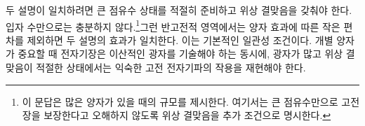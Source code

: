 두 설명이 일치하려면 큰 점유수 상태를 적절히 준비하고 위상 결맞음을 갖춰야 한다. 입자 수만으로는 충분하지 않다.\footnote{이 문답은 많은 양자가 있을 때의 규모를 제시한다. 여기서는 큰 점유수만으로 고전장을 보장한다고 오해하지 않도록 위상 결맞음을 추가 조건으로 명시한다.}그런 반고전적 영역에서는 양자 효과에 따른 작은 편차를 제외하면 두 설명의 효과가 일치한다. 이는 기본적인 일관성 조건이다. 개별 양자가 중요할 때 전자기장은 이산적인 광자를 기술해야 하는 동시에, 광자가 많고 위상 결맞음이 적절한 상태에서는 익숙한 고전 전자기파의 작용을 재현해야 한다.
